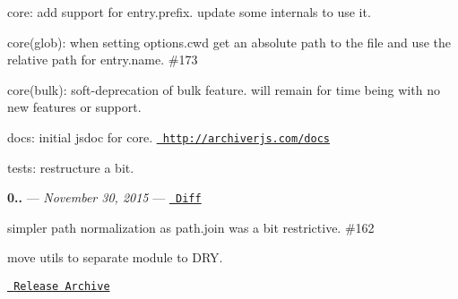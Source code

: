 \begin{DoxyItemize}
\item core\+: add support for {\ttfamily entry.\+prefix}. update some internals to use it.
\item core(glob)\+: when setting {\ttfamily options.\+cwd} get an absolute path to the file and use the relative path for {\ttfamily entry.\+name}. \#173
\item core(bulk)\+: soft-\/deprecation of {\ttfamily bulk} feature. will remain for time being with no new features or support.
\item docs\+: initial jsdoc for core. \href{http://archiverjs.com/docs}{\texttt{ http\+://archiverjs.\+com/docs}}
\item tests\+: restructure a bit.
\end{DoxyItemize}

{\bfseries{0..}} — 
\footnotesize {\itshape November 30, 2015}
\normalsize  — \href{https://github.com/archiverjs/node-archiver/compare/0.19.0...0.20.0}{\texttt{ Diff}}


\begin{DoxyItemize}
\item simpler path normalization as path.\+join was a bit restrictive. \#162
\item move utils to separate module to DRY.
\end{DoxyItemize}

\href{https://github.com/archiverjs/node-archiver/releases}{\texttt{ Release Archive}} 